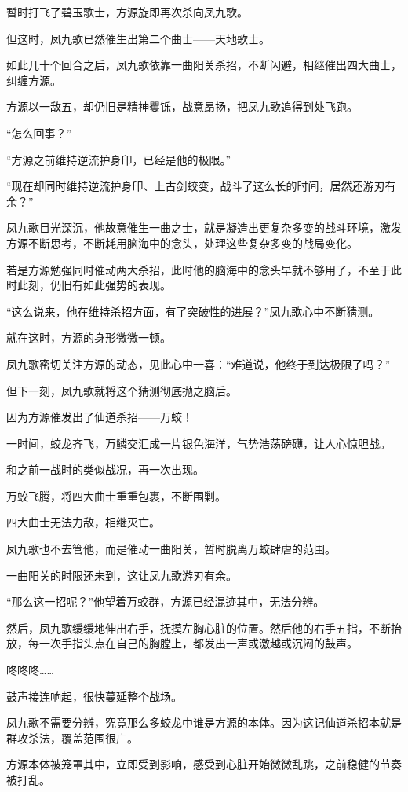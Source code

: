 \begin{this_body}
暂时打飞了碧玉歌士，方源旋即再次杀向凤九歌。

但这时，凤九歌已然催生出第二个曲士——天地歌士。

如此几十个回合之后，凤九歌依靠一曲阳关杀招，不断闪避，相继催出四大曲士，纠缠方源。

方源以一敌五，却仍旧是精神矍铄，战意昂扬，把凤九歌追得到处飞跑。

“怎么回事？”

“方源之前维持逆流护身印，已经是他的极限。”

“现在却同时维持逆流护身印、上古剑蛟变，战斗了这么长的时间，居然还游刃有余？”

凤九歌目光深沉，他故意催生一曲之士，就是凝造出更复杂多变的战斗环境，激发方源不断思考，不断耗用脑海中的念头，处理这些复杂多变的战局变化。

若是方源勉强同时催动两大杀招，此时他的脑海中的念头早就不够用了，不至于此时此刻，仍旧有如此强势的表现。

“这么说来，他在维持杀招方面，有了突破性的进展？”凤九歌心中不断猜测。

就在这时，方源的身形微微一顿。

凤九歌密切关注方源的动态，见此心中一喜：“难道说，他终于到达极限了吗？”

但下一刻，凤九歌就将这个猜测彻底抛之脑后。

因为方源催发出了仙道杀招——万蛟！

一时间，蛟龙齐飞，万鳞交汇成一片银色海洋，气势浩荡磅礴，让人心惊胆战。

和之前一战时的类似战况，再一次出现。

万蛟飞腾，将四大曲士重重包裹，不断围剿。

四大曲士无法力敌，相继灭亡。

凤九歌也不去管他，而是催动一曲阳关，暂时脱离万蛟肆虐的范围。

一曲阳关的时限还未到，这让凤九歌游刃有余。

“那么这一招呢？”他望着万蛟群，方源已经混迹其中，无法分辨。

然后，凤九歌缓缓地伸出右手，抚摸左胸心脏的位置。然后他的右手五指，不断抬放，每一次手指头点在自己的胸膛上，都发出一声或激越或沉闷的鼓声。

咚咚咚……

鼓声接连响起，很快蔓延整个战场。

凤九歌不需要分辨，究竟那么多蛟龙中谁是方源的本体。因为这记仙道杀招本就是群攻杀法，覆盖范围很广。

方源本体被笼罩其中，立即受到影响，感受到心脏开始微微乱跳，之前稳健的节奏被打乱。


\end{this_body}
